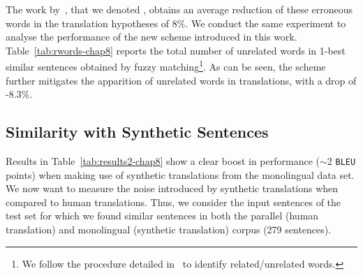 The work by~\citet{xu20boosting}, that we denoted , obtains an average reduction of these erroneous words in the translation hypotheses of 8\%. We conduct the same experiment to analyse the performance of the new scheme  introduced in this work.
%
Table~\ref{tab:rwords-chap8} reports the total number of unrelated words in 1-best similar sentences obtained by fuzzy matching\footnote{We follow the procedure detailed in~\citet{xu20boosting} to identify related/unrelated words.}. As can be seen, the scheme  further mitigates the apparition of unrelated words in translations, with a drop of -8.3\%.

\begin{table*}[h!]
\begin{center}

\end{center}
  \caption{Number of unrelated words appearing in test sets according to different augmentation schemes. The last row indicates the total number of unrelated words included in 1-best  similar sentences.}
  \label{tab:rwords-chap8}
\end{table*}

\subsection*{Similarity with Synthetic Sentences}

Results in Table~\ref{tab:results2-chap8} show a clear boost in performance ($\sim$2 \texttt{BLEU} points) when making use of synthetic translations from the  monolingual data set.
We now want to measure the noise introduced by synthetic translations when compared to human translations.
Thus, we consider the input sentences of the  test set for which we found similar sentences in both the parallel (human translation) and monolingual (synthetic translation) corpus (279 sentences).

